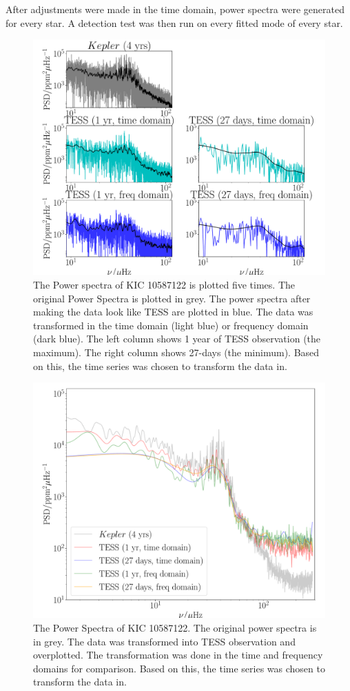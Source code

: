 \documentclass[a4paper,fleqn,usenatbib,useAMS]{mnras}
\begin{document}
After adjustments were made in the time domain, power spectra were generated for every star. A detection test was then run on every fitted mode of every star. 
\iffalse
\begin{figure}
	\centering
	\includegraphics[scale=0.3]{diagnostic_plot1_modes}
	\caption{The Power spectra of KIC 10587122 is plotted five times. The original Power Spectra is plotted in grey. The power spectra after making the data look like TESS are plotted in blue. The data was transformed in the time domain (light blue) or frequency domain (dark blue). The left column shows 1 year of TESS observation (the maximum). The right column shows 27-days (the minimum). Based on this, the time series was chosen to transform the data in.}	
	\label{Power Spectra}
\end{figure} 
\begin{figure}
	\centering
	\includegraphics[scale=0.3]{diagnostic_plot2_full}
	\caption{The Power Spectra of KIC 10587122. The original power spectra is in grey. The data was transformed into TESS observation and overplotted. The transformation was done in the time and frequency domains for comparison. Based on this, the time series was chosen to transform the data in.}	
	\label{overplotted PS}
\end{figure} 
\end{document}
